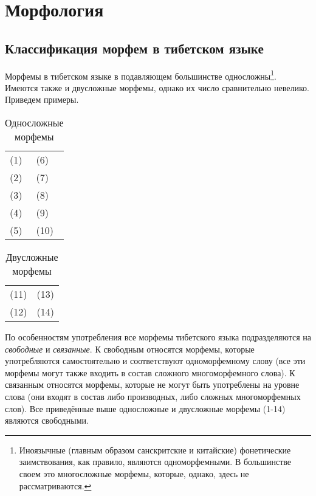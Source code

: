 \chapter{Морфология}

\section{Классификация морфем в тибетском языке}

Морфемы в тибетском языке в подавляющем большинстве односложны\footnote[19]{Иноязычные (главным образом санскритские и китайские) фонетические заимствования, как правило, являются одноморфемными. В большинстве своем это многосложные морфемы, которые, однако, здесь не рассматриваются.}. Имеются также и двусложные морфемы, однако их число сравнительно невелико. Приведем примеры.

\begin{longtabu} to \linewidth{X[1,l]|X[1,l]}
    \caption{Односложные морфемы}\\
    (1)  & (6) \\
    (2)  & (7) \\
    (3)  & (8) \\
    (4)  & (9) \\
    (5)  & (10) \\
\end{longtabu}

\begin{longtabu} to \linewidth{X[1,l]|X[1,l]}
    \caption{Двусложные морфемы}\\
    (11)  & (13) \\
    (12)  & (14) \\
\end{longtabu}

По особенностям употребления все морфемы тибетского языка подразделяются на \emph{свободные} и \emph{связанные}. К свободным относятся морфемы, которые употребляются самостоятельно и соответствуют одноморфемному слову (все эти морфемы могут также входить в состав сложного многоморфемного слова). К связанным относятся морфемы, которые не могут быть употреблены на уровне слова (они входят в состав либо производных, либо сложных многоморфемных слов). Все приведённые выше односложные и двусложные морфемы (1-14) являются свободными.

